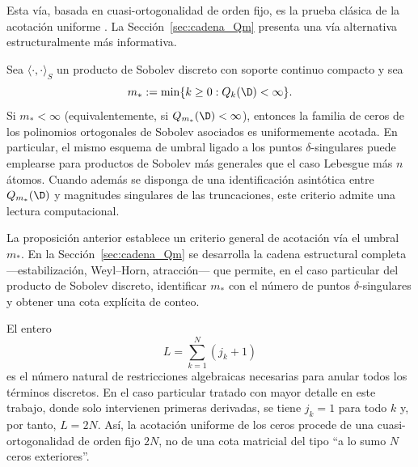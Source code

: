 \begin{rmk}\label{rem:via_clasica}
	Esta vía, basada en cuasi-ortogonalidad de orden fijo, es la prueba clásica de la acotación uniforme \cite{lopez1999zero,marcellan2015sobolev}. La Sección~\ref{sec:cadena_Qm} presenta una vía alternativa estructuralmente más informativa.
\end{rmk}

\begin{prop}\label{prop:marco_generalizacion_umbral_singular}
	Sea $\langle\cdot,\cdot\rangle_S$ un producto de Sobolev discreto con soporte continuo compacto y sea
	\[
		m_*:=\min\{k\ge 0: Q_k(\D)<\infty\}.
	\]
	Si $m_*<\infty$ (equivalentemente, si $Q_{m_*}(\D)<\infty$),
	entonces la familia de ceros de los polinomios ortogonales de Sobolev asociados es uniformemente acotada.
	En particular, el mismo esquema de umbral ligado a los puntos $\delta$-singulares puede emplearse para productos de Sobolev más generales que el caso Lebesgue más $n$ átomos.
	Cuando además se disponga de una identificación asintótica entre $Q_{m_*}(\D)$ y magnitudes singulares de las truncaciones, este criterio admite una lectura computacional.
\end{prop}

\begin{rmk}\label{rem:enlace_marco_Qm}
	La proposición anterior establece un criterio general de acotación vía el umbral $m_*$. En la Sección~\ref{sec:cadena_Qm} se desarrolla la cadena estructural completa ---estabilización, Weyl--Horn, atracción--- que permite, en el caso particular del producto de Sobolev discreto, identificar $m_*$ con el número de puntos $\delta$-singulares y obtener una cota explícita de conteo.
\end{rmk}

\begin{rmk}
	El entero
	\[
		L = \sum_{k=1}^N (j_k+1)
	\]
	es el número natural de restricciones algebraicas necesarias para anular todos los términos discretos. En el caso particular tratado con mayor detalle en este trabajo, donde solo intervienen primeras derivadas, se tiene $j_k=1$ para todo $k$ y, por tanto, $L=2N$. Así, la acotación uniforme de los ceros procede de una cuasi-ortogonalidad de orden fijo $2N$, no de una cota matricial del tipo ``a lo sumo $N$ ceros exteriores''.
\end{rmk}

